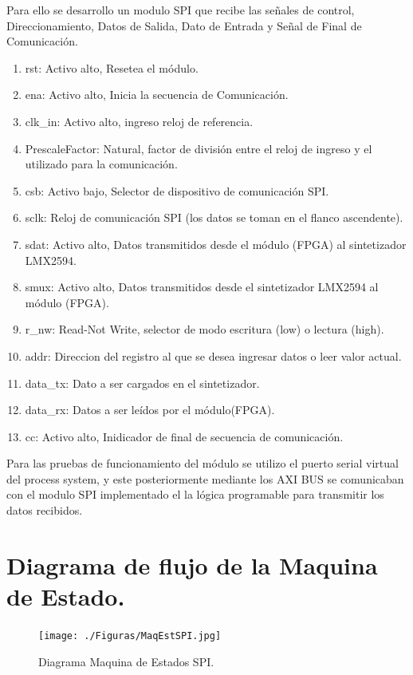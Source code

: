 \documentclass[
11pt, %
]{charter}
\begin{document}
Para ello se desarrollo un modulo SPI que recibe las señales de control, Direccionamiento, Datos de Salida, Dato de Entrada y Señal de Final de Comunicación.

\begin{enumerate}
	\item rst: Activo alto, Resetea el módulo.
	\item ena: Activo alto, Inicia la secuencia de Comunicación.   
	\item clk\_in: Activo alto, ingreso reloj de referencia.
	\item PrescaleFactor: Natural, factor de división entre el reloj de ingreso y el utilizado para la comunicación.
	\item csb: Activo bajo, Selector de dispositivo de comunicación SPI.   
	\item sclk: Reloj de comunicación SPI (los datos se toman en el flanco ascendente).  
	\item sdat: Activo alto, Datos transmitidos desde el módulo (FPGA) al sintetizador LMX2594.   
	\item smux: Activo alto, Datos transmitidos desde el sintetizador LMX2594 al módulo (FPGA). 
	\item r\_nw: Read-Not Write, selector de modo escritura (low) o lectura (high).
	\item addr: Direccion del registro al que se desea ingresar datos o leer valor actual.
	\item data\_tx: Dato a ser cargados en el sintetizador.
	\item data\_rx: Datos a ser leídos por el módulo(FPGA).
	\item cc: Activo alto, Inidicador de final de secuencia de comunicación.
\end{enumerate}

Para las pruebas de funcionamiento del módulo se utilizo el puerto serial virtual del process system, y este posteriormente mediante los AXI BUS se comunicaban con el modulo SPI implementado el la lógica programable para transmitir los datos recibidos.



\section{Diagrama de flujo de la Maquina de Estado.}
\label{sec:orgfd5391f}

\begin{figure}[htpb]
\centering 
\texttt{[image: ./Figuras/MaqEstSPI.jpg]}
\caption{Diagrama Maquina de Estados SPI.}
\label{fig:diagBloques}
\end{figure}
\end{document}
